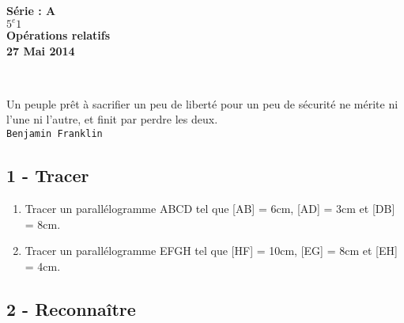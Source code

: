 \documentclass[11pt]{article}
\begin{document}

\begin{minipage}[t]{\textwidth}
  \raggedright
      {\bfseries Série : \textbf{A}}\\
      {\bfseries $5^{e}1$}\\[.35ex]
      \vspace*{-1cm}
      \raggedleft
          {\bfseries Opérations relatifs}\\[.35ex]
          {\bfseries 27 Mai 2014}\\[.35ex]
\end{minipage}\\[1em]

\begin{center}
  \textsf{Un peuple prêt à sacrifier un peu de liberté pour un peu de sécurité ne mérite ni l'une ni l'autre, et finit par perdre les deux.}\\
  \texttt{Benjamin Franklin}
\end{center}

\subsection*{1 - Tracer}
\begin{enumerate}
\item Tracer un parallélogramme ABCD tel que [AB] = 6cm, [AD] = 3cm et [DB] = 8cm.
\item Tracer un parallélogramme EFGH tel que [HF] = 10cm, [EG] = 8cm et [EH] = 4cm.
\end{enumerate}

\subsection*{2 - Reconnaître}
\end{document}
